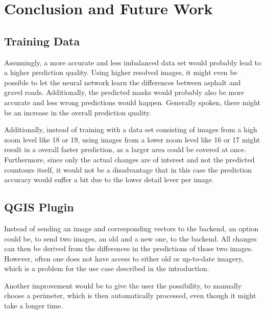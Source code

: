 
\chapter{Conclusion and Future Work}\label{chp:conclusion_and_future_work}

\section{Training Data}
Assumingly, a more accurate and less imbalanced data set would probably lead to a higher prediction quality. Using higher resolved images, it might even be possible to let the neural network learn the differences between asphalt and gravel roads. Additionally, the predicted masks would probably also be more accurate and less wrong predictions would happen. Generally spoken, there might be an increase in the overall prediction quality.

Additionally, instead of training with a data set consisting of images from a high zoom level like 18 or 19, using images from a lower zoom level like 16 or 17 might result in a overall faster prediction, as a larger area could be covered at once. Furthermore, since only the actual changes are of interest and not the predicted countours itself, it would not be a disadvantage that in this case the prediction accuracy would suffer a bit due to the lower detail lever per image.

\section{QGIS Plugin}
Instead of sending an image and corresponding vectors to the backend, an option could be, to send two images, an old and a new one, to the backend. All changes can then be derived from the differences in the predictions of those two images. However, often one does not have access to either old or up-to-date imagery,
which is a problem for the use case described in the introduction.

Another improvement would be to give the user the possibility, to manually choose a perimeter, which is then automatically processed, even though it might take a longer time.